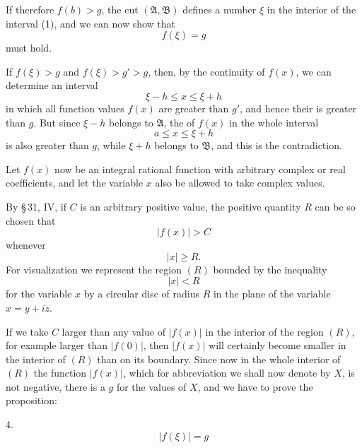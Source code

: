 
If therefore $f(b)>g$, the cut $(\mathfrak A,\mathfrak B)$ defines a number $\xi$ in the interior of the interval (1), and we can now show that
\begin{equation}
 f(\xi)=g
\tag{3}
\end{equation}
must hold.

If $f(\xi)>g$ and $f(\xi)>g'>g$, then, by the continuity of $f(x)$, we can determine an interval
\[
 \xi-h\le x\le \xi+h
\]
in which all function values $f(x)$ are greater than $g'$, and hence their  is greater than $g$. But since $\xi-h$ belongs to $\mathfrak A$, the  of $f(x)$ in the whole interval
\[
 a\le x\le \xi+h
\]
is also greater than $g$, while $\xi+h$ belongs to $\mathfrak B$, and this is the contradiction.

Let $f(x)$ now be an integral rational function with arbitrary complex or real coefficients, and let the variable $x$ also be allowed to take complex values.

By \S\,31, IV, if $C$ is an arbitrary positive value, the positive quantity $R$ can be so chosen that
\begin{equation}
 |f(x)|>C
\tag{4}
\end{equation}
whenever
\begin{equation}
 |x|\ge R.
\tag{5}
\end{equation}
For visualization we represent the region $(R)$ bounded by the inequality
\[
 |x|<R
\]
for the variable $x$ by a circular disc of radius $R$ in the plane of the variable $x=y+iz$.

If we take $C$ larger than any value of $|f(x)|$ in the interior of the region $(R)$, for example larger than $|f(0)|$, then $|f(x)|$ will certainly become smaller in the interior of $(R)$ than on its boundary. Since now in the whole interior of $(R)$ the function $|f(x)|$, which for abbreviation we shall now denote by $X$, is not negative, there is a  $g$ for the values of $X$, and we have to prove the proposition:

4. 
\begin{equation}
 |f(\xi)|=g
\tag{6}
\end{equation}
